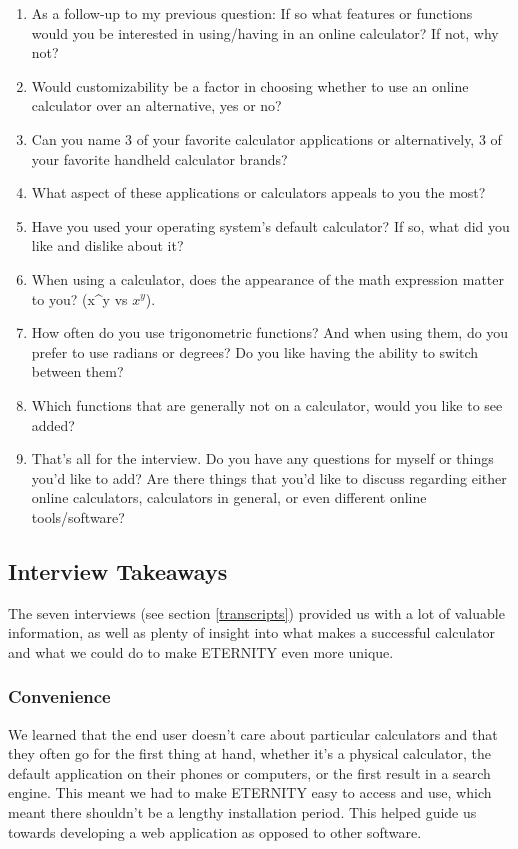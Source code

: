 \documentclass[11pt,onside]{report}
\begin{document}
\begin{enumerate}
    \item As a follow-up to my previous question: If so what features or functions would you be interested in using/having in an online calculator? If not, why not?
    \item Would customizability be a factor in choosing whether to use an online calculator over an alternative, yes or no?
    \item Can you name 3 of your favorite calculator applications or alternatively, 3 of your favorite handheld calculator brands?
    \item What aspect of these applications or calculators appeals to you the most?
    \item Have you used your operating system’s default calculator? If so, what did you like and dislike about it?
    \item When using a calculator, does the appearance of the math expression matter to you? (x\^{}y vs $x^y$).
    \item How often do you use trigonometric functions? And when using them, do you prefer to use radians or degrees? Do you like having the ability to switch between them?
    \item Which functions that are generally not on a calculator, would you like to see added?
    \item That’s all for the interview. Do you have any questions for myself or things you’d like to add? Are there things that you’d like to discuss regarding either online calculators, calculators in general, or even different online tools/software?
\end{enumerate}

\subsection{Interview Takeaways}

The seven interviews (see section \ref{transcripts}) provided us with a lot of valuable information, as well as plenty of insight into what makes a successful calculator and what we could do to make ETERNITY even more unique.

\subsubsection{Convenience}

We learned that the end user doesn't care about particular calculators and that they often go for the first thing at hand, whether it's a physical calculator, the default application on their phones or computers, or the first result in a search engine. This meant we had to make ETERNITY easy to access and use, which meant there shouldn't be a lengthy installation period. This helped guide us towards developing a web application as opposed to other software.
\end{document}
